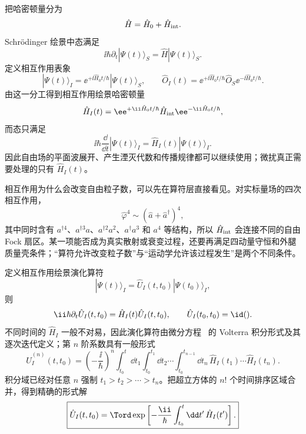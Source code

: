 把哈密顿量分为
\begin{equation*}
 \hat H=\hat H_0+\hat H_{\rm int}.
\end{equation*}
Schr\"odinger 绘景中态满足
\begin{equation*}
 \ii\hbar\partial_t|\Psi(t)\rangle_S
 =\hat H|\Psi(t)\rangle_S.
\end{equation*}
定义相互作用表象
\begin{equation}
 |\Psi(t)\rangle_I
 =\ee^{+\ii\hat H_0t/\hbar}|\Psi(t)\rangle_S,
 \qquad
 \hat O_I(t)=\ee^{+\ii\hat H_0t/\hbar}\hat O_S \ee^{-\ii\hat H_0t/\hbar}.
 \label{eq:interaction-picture-def-r3}
\end{equation}
由这一分工得到相互作用绘景哈密顿量
\begin{equation}
 \hat H_I(t)
 =\ee^{+\ii\hat H_0t/\hbar}
 \hat H_{\rm int}
 \ee^{-\ii\hat H_0t/\hbar},
 \label{eq:HI-interaction-r3}
\end{equation}
而态只满足
\begin{equation}
 \boxed{
 \ii\hbar\frac{\dd}{\dd t}|\Psi(t)\rangle_I
 =\hat H_I(t)|\Psi(t)\rangle_I.}
 \label{eq:interaction-sch-r2}
\end{equation}
因此自由场的平面波展开、产生湮灭代数和传播规律都可以继续使用；微扰真正需要处理的只有 $\hat H_I(t)$。

相互作用为什么会改变自由粒子数，可以先在算符层直接看见。对实标量场的四次相互作用，
\begin{equation*}
 \hat\varphi^4\sim(\hat a+\hat a^\dagger)^4,
\end{equation*}
其中同时含有 $a^{\dagger4}$、$a^{\dagger3}a$、$a^{\dagger2}a^2$、$a^\dagger a^3$ 和 $a^4$ 等结构，所以 $\hat H_{\rm int}$ 会连接不同的自由 Fock 扇区。某一项能否成为真实散射或衰变过程，还要再满足四动量守恒和外腿质量壳条件；“算符允许改变粒子数”与“运动学允许该过程发生”是两个不同条件。

定义相互作用绘景演化算符
\begin{equation*}
 |\Psi(t)\rangle_I
 =\hat U_I(t,t_0)|\Psi(t_0)\rangle_I,
\end{equation*}
则
\begin{equation}
 \ii\hbar\partial_t\hat U_I(t,t_0)
 =\hat H_I(t)\hat U_I(t,t_0),
 \qquad
 \hat U_I(t_0,t_0)=\id().
 \label{eq:UI-diff-r3}
\end{equation}
不同时间的 $\hat H_I$ 一般不对易，因此演化算符由微分方程~ 的 Volterra 积分形式及其逐次迭代定义；第 $n$ 阶系数具有一般形式
\begin{equation}
 \hat U_I^{(n)}(t,t_0)
 =\left(-\frac{\ii}{\hbar}\right)^n
 \int_{t_0}^{t}\dd t_1
 \int_{t_0}^{t_1}\dd t_2\cdots
 \int_{t_0}^{t_{n-1}}\dd t_n\,
 \hat H_I(t_1)\cdots\hat H_I(t_n).
 \label{eq:dyson-general-simplex-dp73}
\end{equation}
积分域已经对任意 $n$ 强制 $t_1>t_2>\cdots>t_n$。把超立方体的 $n!$ 个时间排序区域合并，得到精确的形式解
\begin{equation}
 \boxed{
 \hat U_I(t,t_0)
 =\Tord\exp\left[-\frac{\ii}{\hbar}
 \int_{t_0}^{t}\dd t'\,\hat H_I(t')\right].}
 \label{eq:dyson-r2}\end{equation}

